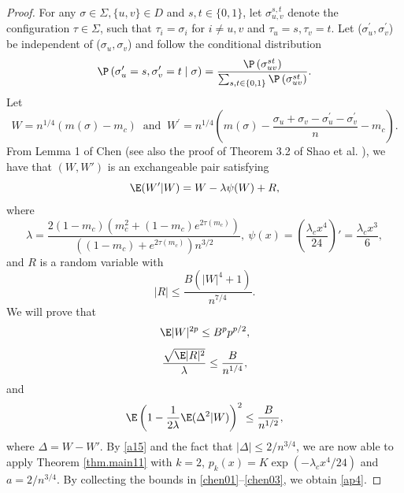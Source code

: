 	\begin{proof}
		For any $\sigma \in \Sigma, \{u,v\} \in D$ and $s, t \in\{0,1\}$, let $\sigma_{u,v}^{s,t}$ denote the configuration $\tau \in \Sigma$, such that $\tau_i=\sigma_i$ for $i \neq u, v$ and $\tau_u=s, \tau_v=t$. Let ($\sigma_u^{\prime}, \sigma_v^{\prime}$) be independent of ($\sigma_u, \sigma_v$) and follow the conditional distribution
		\[\P\left(\sigma_u^{\prime}=s, \sigma_v^{\prime}=t \mid \sigma\right)=\frac{\P\left(\sigma_{u v}^{s t}\right)}{\sum_{s, t \in\{0,1\}} \P\left(\sigma_{u v}^{s t}\right)}.\]
		Let
		\[W=n^{1/4}(m(\sigma)-m_c)\ \text{ and }\ W^{\prime}=n^{1/4}\left(m(\sigma)-\frac{\sigma_u+\sigma_v-\sigma_u^{\prime}-\sigma_v^{\prime}}{n}-m_c\right).\]
		From Lemma 1 of Chen \cite{chen2016limit} (see also the proof of Theorem 3.2 of Shao et al. \cite{shao2021cramer}), we have
		that $(W,W')$ is an exchangeable pair satisfying
		\begin{equation}\label{a15}
			\E(W'|W) = W-\lambda \psi(W) +R,
		\end{equation} 
		where
		\[\lambda=\dfrac{2(1-m_c)\left(m_{c}^2+(1-m_{c})e^{2\tau(m_{c})}\right)}{\left((1-m_{c})+e^{2\tau(m_{c})}\right)n^{3/2}},\ \psi(x)=\left(\frac{\lambda_c x^4}{24}\right)'=\frac{\lambda_c x^{3}}{6},\]
		and $R$ is a random variable with
		\begin{equation}\label{chen.boundR}
			|R| \le \frac{B\left(|W|^4+1\right)}{n^{7/4}}.
		\end{equation}
		We will prove that
		\begin{equation}\label{chen01}
			\E|W|^{2p}\le B^p p^{p/2},
		\end{equation}
		\begin{equation}\label{chen02}
			\frac{\sqrt{\E|R|^{2}}}{\lambda}\le \frac{B}{n^{1/4}},
		\end{equation}
		and
		\begin{equation}\label{chen03}
			\E\left( 1- \frac{1}{2\lambda}\E({\Delta}^2|W)\right)^2\le \frac{B}{n^{1/2}},
		\end{equation}
		where $\Delta=W-W'$. By \eqref{a15} and the fact that $|\Delta|\le 2/n^{3/4}$,
		we are now able to apply Theorem \ref{thm.main11} with $k=2$, $p_k(x)=K\exp(-\lambda_cx^4/24)$ and $a=2/n^{3/4}$.
		By collecting the bounds in \eqref{chen01}--\eqref{chen03}, we obtain \eqref{ap4}. 
		

\end{proof}
